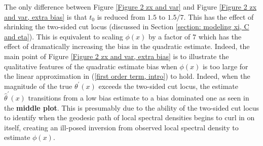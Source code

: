 \documentclass[10pt,noinfoline]{imsart}
\begin{document}
The only difference between Figure \ref{Figure 2 zx and var} and Figure \ref{Figure 2 zx and var, extra bias}
is that $t_0$ is reduced from $1.5$ to $1.5/7$. This has the effect of shrinking the two-sided cut locus (discussed in Section \ref{section: modeling xi, C and eta}). This is  equivalent to scaling $\phi(x)$ by a factor of $7$ which has the effect of dramatically increasing the bias in the quadratic estimate. Indeed, the main point of Figure \ref{Figure 2 zx and var, extra bias} is to illustrate the qualitative features of the quadratic estimate bias when $\phi(x)$ is too large for the linear approximation in (\ref{first order term, intro}) to hold. 
Indeed, when the magnitude of the true $\theta^\prime(x)$ exceeds the two-sided cut locus, the estimate $\hat\theta^\prime(x)$ transitions from a low bias estimate to a bias dominated one as seen in the \textbf{middle plot}. This is presumably due to the ability of the two-sided cut locus to identify when the geodesic path of local spectral densities begins to curl in on itself, creating an ill-posed inversion from observed local spectral density to estimate $\phi(x)$.
 
\end{document}
